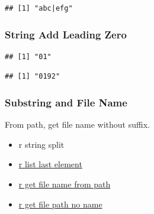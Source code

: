 \documentclass[
]{book}
\newenvironment{Shaded}{\begin{snugshade}}{\end{snugshade}}
\newcommand{\CommentTok}[1]{\textcolor[rgb]{0.56,0.35,0.01}{\textit{#1}}}
\newcommand{\DecValTok}[1]{\textcolor[rgb]{0.00,0.00,0.81}{#1}}
\newcommand{\KeywordTok}[1]{\textcolor[rgb]{0.13,0.29,0.53}{\textbf{#1}}}
\newcommand{\NormalTok}[1]{#1}
\newcommand{\StringTok}[1]{\textcolor[rgb]{0.31,0.60,0.02}{#1}}
\providecommand{\tightlist}{%
  \setlength{\itemsep}{0pt}\setlength{\parskip}{0pt}}
\begin{document}
\begin{verbatim}
## [1] "abc|efg"
\end{verbatim}

\hypertarget{string-add-leading-zero}{%
\subsubsection{String Add Leading Zero}\label{string-add-leading-zero}}

\begin{Shaded}
\end{Shaded}

\begin{verbatim}
## [1] "01"
\end{verbatim}

\begin{Shaded}
\end{Shaded}

\begin{verbatim}
## [1] "0192"
\end{verbatim}

\hypertarget{substring-and-file-name}{%
\subsubsection{Substring and File Name}\label{substring-and-file-name}}

From path, get file name without suffix.

\begin{itemize}
\tightlist
\item
  r string split
\item
  \href{https://stackoverflow.com/a/83222/8280804}{r list last element}
\item
  \href{https://stackoverflow.com/a/29114007/8280804}{r get file name from path}
\item
  \href{https://stackoverflow.com/a/47189541/8280804}{r get file path no name}
\end{itemize}
\end{document}
